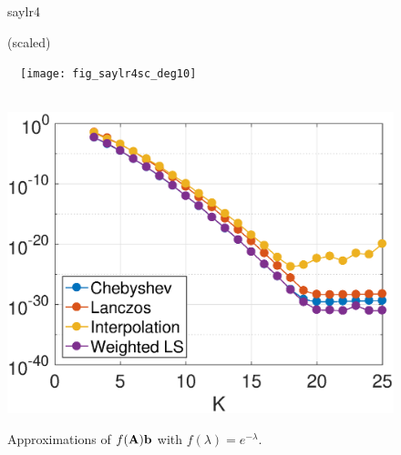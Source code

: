 \documentclass{article}
\begin{document}
\begin{figure}[bth]
\begin{minipage}[m]{0.1\linewidth}
\centerline{\small{saylr4}}
\centerline{\small{(scaled)}}
\end{minipage}
\begin{minipage}[m]{0.44\linewidth}
\centerline{~~\texttt{[image: fig\_saylr4sc\_deg10]}}
\end{minipage}
\begin{minipage}[m]{0.44\linewidth}
\centerline{~~\includegraphics[width=.95\linewidth]{fig_saylr4sc_err_const_b}}
\end{minipage}
\caption{Approximations of $f({\bf A}){\bf b}$ with $f(\lambda)=e^{-\lambda}$.}\label{Fig:numerical}
\end{figure}
\end{document}
